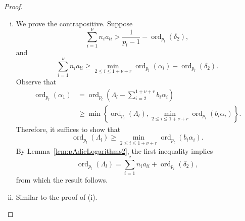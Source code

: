 \documentclass[11pt]{report}
\theoremstyle{definition}
\DeclareMathOperator{\ord}{ord}
\begin{document}
\begin{proof} \
\begin{enumerate}[(i)]
\item We prove the contrapositive. Suppose
\[\sum_{i = 1}^{\nu} n_i a_{li} > \frac{1}{p_l-1} - \ord_{p_l}(\delta_2), \]
and
\[\sum_{i = 1}^{\nu} n_i a_{li}  \geq \displaystyle \min_{2 \leq i \leq 1+\nu+r} \ord_{p_l}(\alpha_{i}) - \ord_{p_l}(\delta_2).\]
Observe that
\begin{align*}
\ord_{p_l}(\alpha_{1})
	& = \ord_{p_l}\left( \Lambda_{l} - \sum_{i = 2}^{1+\nu+r}b_i\alpha_{i}\right) \\
	& \geq \min\left\{ \ord_{p_l}(\Lambda_{l}), \min_{2 \leq i \leq 1+\nu+r} \ord_{p_l}(b_i\alpha_{i})\right\}.
\end{align*}
Therefore, it suffices to show that
\[\ord_{p_l}(\Lambda_{l}) \geq \min_{2 \leq i \leq 1+\nu+r} \ord_{p_l}(b_i\alpha_{i}).\]
By Lemma~\ref{lem:pAdicLogarithms2}, the first inequality implies
\[{\ord_{p_l}(\Lambda_{l}) = \displaystyle \sum_{i = 1}^{\nu} n_ia_{li} + \ord_{p_l}(\delta_2)},\]
from which the result follows.

\item Similar to the proof of (i).
\end{enumerate}
\end{proof}

\end{document}
